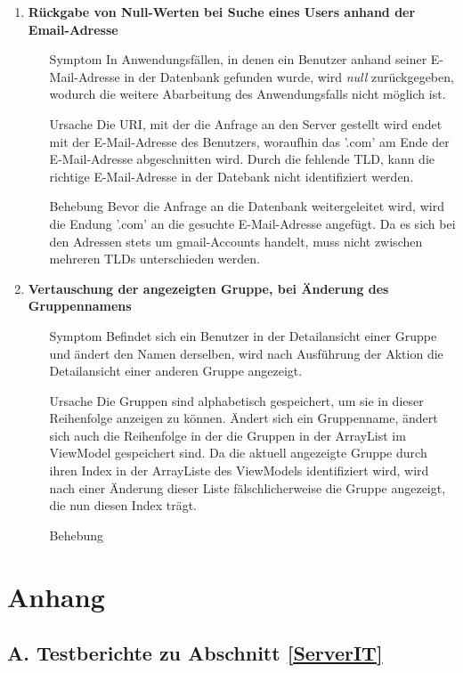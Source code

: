 \documentclass[11pt,a4paper]{scrartcl}
\def\threedigits#1{%
  \ifnum#1<100 0\fi
  \ifnum#1<10 0\fi
  \number#1}
\begin{document}
\begin{enumerate}[label={\textbf{/B\protect\threedigits{\theenumi}0/}}, leftmargin=*]
\item \textbf{Rückgabe von Null-Werten bei Suche eines Users anhand der Email-Adresse}
	\begin{itemize}
		\item[Symptom] In Anwendungsfällen, in denen ein Benutzer anhand seiner E-Mail-Adresse in der Datenbank gefunden wurde, wird \textit{null} zurückgegeben, wodurch die weitere Abarbeitung des Anwendungsfalls nicht möglich ist.
		\item[Ursache] Die URI, mit der die Anfrage an den Server gestellt wird endet mit der E-Mail-Adresse des Benutzers, woraufhin das '.com' am Ende der E-Mail-Adresse abgeschnitten wird. Durch die fehlende TLD, kann die richtige E-Mail-Adresse in der Datebank nicht identifiziert werden.
		\item[Behebung] Bevor die Anfrage an die Datenbank weitergeleitet wird, wird die Endung '.com' an die gesuchte E-Mail-Adresse angefügt. Da es sich bei den Adressen stets um gmail-Accounts handelt, muss nicht zwischen mehreren TLDs unterschieden werden.
	\end{itemize}
	
\item \textbf{Vertauschung der angezeigten Gruppe, bei Änderung des Gruppennamens}
	\begin{itemize}
		\item[Symptom] Befindet sich ein Benutzer in der Detailansicht einer Gruppe und ändert den Namen derselben, wird nach Ausführung der Aktion die Detailansicht einer anderen Gruppe angezeigt.
		\item[Ursache] Die Gruppen sind alphabetisch gespeichert, um sie in dieser Reihenfolge anzeigen zu können. Ändert sich ein Gruppenname, ändert sich auch die Reihenfolge in der die Gruppen in der ArrayList im ViewModel gespeichert sind. Da die aktuell angezeigte Gruppe durch ihren Index in der ArrayListe des ViewModels identifiziert wird, wird nach einer Änderung dieser Liste fälschlicherweise die Gruppe angezeigt, die nun diesen Index trägt.
		\item[Behebung] %
	\end{itemize}

\end{enumerate}

\newpage

\section*{Anhang}

\subsection*{A. Testberichte zu Abschnitt \ref{ServerIT}}
\end{document}
